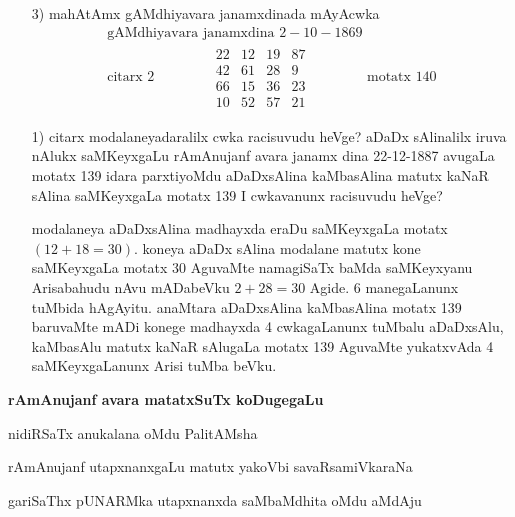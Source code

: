 \begin{enumerate}
{\rm 4}neV vagaRda mAyAcwkada racane
$A, B, C, D$ matutx $P, Q, R, S$ beVre beVre dhana pUNaRMkagaLAgirali Aga keLage koTiTxruva mAyAcwkavu meVlina akaSxragaLige yAvudeV dhana pUNARMka bele koTaTxrU sari hoVguva pUNARMka mAyA cwkavAgirutatxde.
$$
\begin{matrix}
A+P & D+S & C+Q & B+R\\
C+R & B+Q & A+S & D+P\\
B+S & C+P & D+R & A+Q\\
D+Q & A+R & B+P & C+S
\end{matrix}
$$

\item[{\rm 3)}] mahAtAmx gAMdhiyavara janamxdinada mAyAcwka
\begin{gather*}
\text{gAMdhiyavara janamxdina }  2-10-1869\\
\text{citarx } 2 \qquad \qquad 
\begin{matrix}
22 & 12 & 19 & 87\\
42 & 61 & 28 & 9\\
66 & 15 & 36 & 23\\
10 & 52 & 57 & 21
\end{matrix} \qquad \qquad 
\text{motatx } 140
\end{gather*}

\item[{\rm 1)}] citarx modalaneyadaralilx cwka racisuvudu heVge? aDaDx sAlinalilx iruva nAlukx saMKeyxgaLu rAmAnujanf avara janamx dina {\rm 22-12-1887} avugaLa motatx {\rm 139} idara parxtiyoMdu aDaDxsAlina kaMbasAlina matutx kaNaR sAlina saMKeyxgaLa motatx {\rm 139} I cwkavanunx racisuvudu heVge? 

modalaneya aDaDxsAlina madhayxda eraDu saMKeyxgaLa motatx $(12+18=30).$ koneya aDaDx sAlina modalane matutx kone saMKeyxgaLa motatx {\rm 30} AguvaMte namagiSaTx baMda saMKeyxyanu Arisabahudu nAvu mADabeVku $2+28=30$ Agide. {\rm 6} manegaLanunx tuMbida hAgAyitu. anaMtara aDaDxsAlina kaMbasAlina motatx {\rm 139} baruvaMte mADi konege madhayxda {\rm 4} cwkagaLanunx tuMbalu aDaDxsAlu, kaMbasAlu matutx kaNaR sAlugaLa motatx {\rm 139} AguvaMte yukatxvAda {\rm 4} saMKeyxgaLanunx Arisi tuMba beVku.
\end{enumerate}

\textbf{rAmAnujanf avara matatxSuTx koDugegaLu}

nidiRSaTx anukalana oMdu PalitAMsha

rAmAnujanf utapxnanxgaLu matutx yakoVbi savaRsamiVkaraNa

gariSaThx pUNARMka utapxnanxda saMbaMdhita oMdu aMdAju


